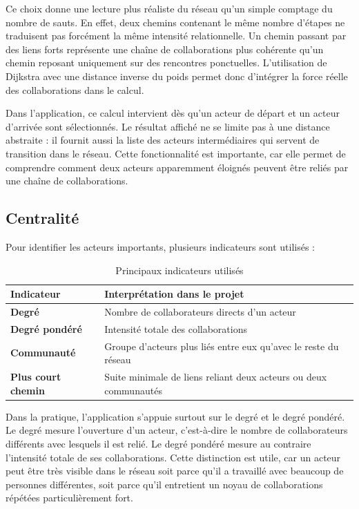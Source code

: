 \documentclass[a4paper,12pt]{article}
\begin{document}
Ce choix donne une lecture plus réaliste du réseau qu'un simple comptage du nombre de sauts. En effet, deux chemins contenant le même nombre d'étapes ne traduisent pas forcément la même intensité relationnelle. Un chemin passant par des liens forts représente une chaîne de collaborations plus cohérente qu'un chemin reposant uniquement sur des rencontres ponctuelles. L'utilisation de Dijkstra avec une distance inverse du poids permet donc d'intégrer la force réelle des collaborations dans le calcul.

Dans l'application, ce calcul intervient dès qu'un acteur de départ et un acteur d'arrivée sont sélectionnés. Le résultat affiché ne se limite pas à une distance abstraite : il fournit aussi la liste des acteurs intermédiaires qui servent de transition dans le réseau. Cette fonctionnalité est importante, car elle permet de comprendre comment deux acteurs apparemment éloignés peuvent être reliés par une chaîne de collaborations.
\newpage
\subsection{Centralité}

Pour identifier les acteurs importants, plusieurs indicateurs sont utilisés :

\begin{table}[H]
\centering
\small
\begin{tabularx}{\linewidth}{>{\bfseries\color{maincolor}}l X}
\toprule
\rowcolor{lightbg}
Indicateur & Interprétation dans le projet \\
\midrule
Degré & Nombre de collaborateurs directs d'un acteur \\
Degré pondéré & Intensité totale des collaborations \\
Communauté & Groupe d'acteurs plus liés entre eux qu'avec le reste du réseau \\
Plus court chemin & Suite minimale de liens reliant deux acteurs ou deux communautés \\
\bottomrule
\end{tabularx}
\caption{Principaux indicateurs utilisés}
\end{table}

Dans la pratique, l'application s'appuie surtout sur le degré et le degré pondéré. Le degré mesure l'ouverture d'un acteur, c'est-à-dire le nombre de collaborateurs différents avec lesquels il est relié. Le degré pondéré mesure au contraire l'intensité totale de ses collaborations. Cette distinction est utile, car un acteur peut être très visible dans le réseau soit parce qu'il a travaillé avec beaucoup de personnes différentes, soit parce qu'il entretient un noyau de collaborations répétées particulièrement fort.
\end{document}
